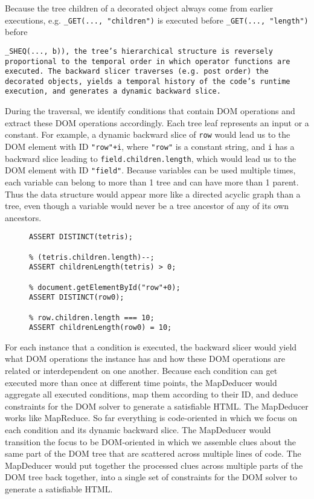 Because the tree children of a decorated object always come from earlier executions, e.g. {\tt \_GET(..., "children")} is executed before {\tt \_GET(..., "length")} before {\tt \_SHEQ(..., b)), the tree's hierarchical structure is reversely proportional to the temporal order in which operator functions are executed.  
The backward slicer traverses (e.g. post order) the decorated objects, yields a temporal history of the code's runtime execution, and generates a dynamic backward slice.  

During the traversal, we identify conditions that contain DOM operations and extract these DOM operations accordingly.  Each tree leaf represents an input or a constant.  
For example, a dynamic backward slice of {\tt row} would lead us to the DOM element with ID {\tt "row"+i}, where {\tt "row"} is a constant string, and {\tt i} has a backward slice leading to {\tt field.children.length}, which would lead us to the DOM element with ID {\tt "field"}.  
Because variables can be used multiple times, each variable can belong to more than 1 tree and can have more than 1 parent.  Thus the data structure would appear more like a directed acyclic graph than a tree, even though a variable would never be a tree ancestor of any of its own ancestors.  

\begin{figure}
\begin{lstlisting}[caption=DOM constraints for generating an HTML that would satisfy for going the {\tt True} branch in the {\tt if} statement of Sample Code ~\ref{dom0}.  The constraints are shown in the input format for the CVC~\cite{cvc3} implementation of the SMT solver. "\%" is the comment operator in CVC.,label=constraints0]
% document.getElementById("tetris");
ASSERT DISTINCT(tetris);

% (tetris.children.length)--;
ASSERT childrenLength(tetris) > 0;

% document.getElementById("row"+0);
ASSERT DISTINCT(row0);

% row.children.length === 10;
ASSERT childrenLength(row0) = 10;

\end{lstlisting}
\end{figure}

For each instance that a condition is executed, the backward slicer would yield what DOM operations the instance has and how these DOM operations are related or interdependent on one another.  
Because each condition can get executed more than once at different time points, the MapDeducer would aggregate all executed conditions, map them according to their ID, and deduce constraints for the DOM solver to generate a satisfiable HTML.  
The MapDeducer works like MapReduce.  So far everything is code-oriented in which we focus on each condition and its dynamic backward slice.  The MapDeducer would transition the focus to be DOM-oriented in which we assemble clues about the same part of the DOM tree that are scattered across multiple lines of code.  
The MapDeducer would put together the processed clues across multiple parts of the DOM tree back together, into a single set of constraints for the DOM solver to generate a satisfiable HTML.  

}
